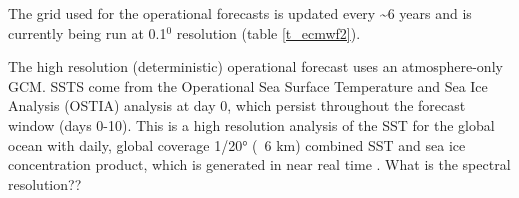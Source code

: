The grid used for the operational forecasts is updated every \textasciitilde{6} years and is currently being run at 0.1$^0$ resolution (table \ref{t_ecmwf2}).
%
%
%
%
%
%
%
%


The high resolution (deterministic) operational forecast uses an atmosphere-only GCM. SSTS come from the Operational Sea Surface Temperature and Sea Ice Analysis (OSTIA) analysis at day 0, which persist throughout the forecast window (days 0-10). This is a high resolution analysis of the SST for the global ocean with daily, global coverage 1/20° (~6 km) combined SST and sea ice concentration product, which is generated in near real time \citep{donlon2012operational}.
What is the spectral resolution??


